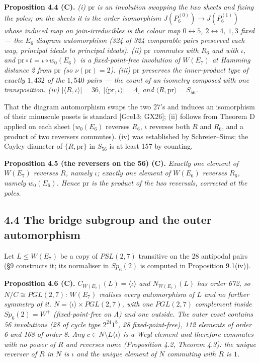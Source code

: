\documentclass[
]{article}
\newcounter{none} %
\begin{document}
\textbf{Proposition 4.4 (C).} \emph{(i) \(\mathrm{pr}\) is an involution
swapping the two sheets and fixing the poles; on the sheets it is the
order isomorphism \(J(P_6^{(0)}) \to J(P_6^{(1)})\) whose induced map on
join-irreducibles is the colour map \(0 \leftrightarrow 5\),
\(2 \leftrightarrow 4\), \(1, 3\) fixed --- the \(E_6\) diagram
automorphism (324 of 324 comparable pairs preserved each way, principal
ideals to principal ideals). (ii) \(\mathrm{pr}\) commutes with \(R_6\)
and with \(\iota\), and \(\mathrm{pr} \circ t = \iota \circ w_0(E_6)\)
is a fixed-point-free involution of \(W(E_7)\) at Hamming distance 2
from \(\mathrm{pr}\) (so \(\nu(\mathrm{pr}) = 2\)). (iii)
\(\mathrm{pr}\) preserves the inner-product type of exactly \(1{,}432\)
of the \(1{,}540\) pairs --- the count of an isometry composed with one
transposition. (iv) \(|\langle R, \iota \rangle| = 36\),
\(|\langle \mathrm{pr}, \iota \rangle| = 4\), and
\(\langle R, \mathrm{pr} \rangle = S_{56}\).}

That the diagram automorphism swaps the two 27's and induces an
isomorphism of their minuscule posets is standard {[}Gre13; GX26{]};
(ii) follows from Theorem D applied on each sheet (\(w_0(E_6)\) reverses
\(R_6\), \(\iota\) reverses both \(R\) and \(R_6\), and a product of two
reversers commutes). (iv) was established by Schreier--Sims; the Cayley
diameter of \(\{R, \mathrm{pr}\}\) in \(S_{56}\) is at least 157 by
counting.

\textbf{Proposition 4.5 (the reversers on the 56) (C).} \emph{Exactly
one element of \(W(E_7)\) reverses \(R\), namely \(\iota\); exactly one
element of \(W(E_6)\) reverses \(R_6\), namely \(w_0(E_6)\). Hence
\(\mathrm{pr}\) is the product of the two reversals, corrected at the
poles.}

\subsection{4.4 The bridge subgroup and the outer
automorphism}\label{the-bridge-subgroup-and-the-outer-automorphism}

Let \(L \le W(E_7)\) be a copy of \(PSL(2,7)\) transitive on the 28
antipodal pairs (§9 constructs it; its normaliser in \(Sp_6(2)\) is
computed in Proposition 9.1(iv)).

\textbf{Proposition 4.6 (C).}
\emph{\(C_{W(E_7)}(L) = \langle \iota \rangle\) and \(N_{W(E_7)}(L)\)
has order 672, so \(N/C \cong PGL(2,7)\): \(W(E_7)\) realises every
automorphism of \(L\) and no further symmetry of it.
\(N = \langle\iota\rangle \times PGL(2,7)\), with one \(PGL(2,7)\)
complement inside \(Sp_6(2) = W^+\) (fixed-point-free on \(\Lambda\))
and one outside. The outer coset contains 56 involutions (28 of cycle
type \(2^{24}1^8\), 28 fixed-point-free), 112 elements of order 6 and
168 of order 8. Any \(c \in N \setminus L\langle\iota\rangle\) is a Weyl
element and therefore commutes with no power of \(R\) and reverses none
(Proposition 4.2, Theorem 4.3): the unique reverser of \(R\) in \(N\) is
\(\iota\) and the unique element of \(N\) commuting with \(R\) is
\(1\).}
\end{document}
